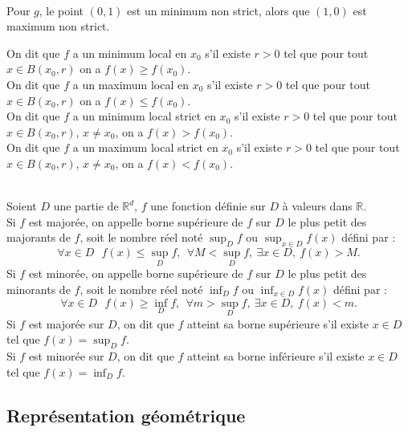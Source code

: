 \documentclass[class=report,crop=false]{standalone}
\begin{document}
\\
Pour $g$, le point $(0,1)$ est un minimum non strict, alors que $(1,0)$ est maximum non strict.

\begin{definition}
On dit que $f$ a un minimum local en $x_0$ s'il existe $r>0$ tel que pour tout $x\in B(x_0,r)$ on a $f(x)\geq f(x_0)$.\\
On dit que $f$ a un maximum local en $x_0$ s'il existe $r>0$ tel que pour tout $x\in B(x_0,r)$ on a $f(x)\leq f(x_0)$.\\
On dit que $f$ a un minimum local strict en $x_0$ s'il existe $r>0$ tel que pour tout $x\in B(x_0,r)$, $x\neq x_0$, on a $f(x)> f(x_0)$.\\
On dit que $f$ a un maximum local strict en $x_0$ s'il existe $r>0$ tel que pour tout $x\in B(x_0,r)$, $x\neq x_0$, on a $f(x)< f(x_0)$.\\
\end{definition}




\\
Soient $D$ une partie de $\mathbb{R}^d$, $f$ une fonction définie sur $D$ \`a valeurs dans $\mathbb{R}$.\\
Si $f$ est majorée, on appelle borne supérieure de $f$ sur $D$ le plus petit des majorants de $f$, soit le nombre réel noté $\sup_D f$ ou $\sup_{x\in D}f(x)$ défini par :
$$
\forall x\in D\ \ \ f(x)\leq \sup_D f, \ \ \forall M<\sup_D f,\  \exists x\in D, \  f(x)>M.
$$
Si $f$ est minorée, on appelle borne supérieure de $f$ sur $D$ le plus petit des minorants de $f$, soit le nombre réel noté $\inf_D f$ ou $\inf_{x\in D}f(x)$ défini par :
$$
\forall x\in D\ \ \ f(x)\geq \inf_D f, \ \ \forall m>\sup_D f,\  \exists x\in D, \  f(x)<m.
$$
Si $f$ est majorée sur $D$, on dit que $f$ atteint sa borne supérieure s'il existe $x\in D$ tel que $f(x)=\sup_D f$. \\
Si $f$ est minorée sur $D$, on dit que $f$ atteint sa borne inférieure s'il existe $x\in D$ tel que $f(x)=\inf_D f$. 


\subsection{Représentation géométrique}
\end{document}
